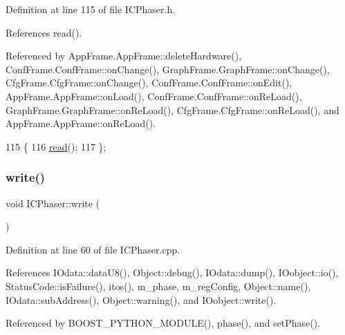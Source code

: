 Definition at line 115 of file I\+C\+Phaser.\+h.



References read().



Referenced by App\+Frame.\+App\+Frame\+::delete\+Hardware(), Conf\+Frame.\+Conf\+Frame\+::on\+Change(), Graph\+Frame.\+Graph\+Frame\+::on\+Change(), Cfg\+Frame.\+Cfg\+Frame\+::on\+Change(), Conf\+Frame.\+Conf\+Frame\+::on\+Edit(), App\+Frame.\+App\+Frame\+::on\+Load(), Conf\+Frame.\+Conf\+Frame\+::on\+Re\+Load(), Graph\+Frame.\+Graph\+Frame\+::on\+Re\+Load(), Cfg\+Frame.\+Cfg\+Frame\+::on\+Re\+Load(), and App\+Frame.\+App\+Frame\+::on\+Re\+Load().


\begin{DoxyCode}
115                  \{
116     \hyperlink{classICPhaser_a79170c0639b8bcedd267a99a1857c9a7}{read}();
117   \};
\end{DoxyCode}
\mbox{\label{classICPhaser_a160d0f9b959c865fc3458857bb303dd0}} 
\subsubsection{\texorpdfstring{write()}{write()}}
{\footnotesize\ttfamily void I\+C\+Phaser\+::write (\begin{DoxyParamCaption}{ }\end{DoxyParamCaption})}



Definition at line 60 of file I\+C\+Phaser.\+cpp.



References I\+Odata\+::data\+U8(), Object\+::debug(), I\+Odata\+::dump(), I\+Oobject\+::io(), Status\+Code\+::is\+Failure(), itos(), m\+\_\+phase, m\+\_\+reg\+Config, Object\+::name(), I\+Odata\+::sub\+Address(), Object\+::warning(), and I\+Oobject\+::write().



Referenced by B\+O\+O\+S\+T\+\_\+\+P\+Y\+T\+H\+O\+N\+\_\+\+M\+O\+D\+U\+L\+E(), phase(), and set\+Phase().


